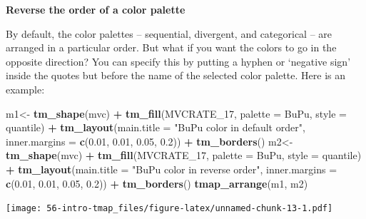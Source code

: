 \documentclass[
]{book}
\newenvironment{Shaded}{\begin{snugshade}}{\end{snugshade}}
\newcommand{\AttributeTok}[1]{\textcolor[rgb]{0.13,0.29,0.53}{#1}}
\newcommand{\FloatTok}[1]{\textcolor[rgb]{0.00,0.00,0.81}{#1}}
\newcommand{\FunctionTok}[1]{\textcolor[rgb]{0.13,0.29,0.53}{\textbf{#1}}}
\newcommand{\NormalTok}[1]{#1}
\newcommand{\OtherTok}[1]{\textcolor[rgb]{0.56,0.35,0.01}{#1}}
\newcommand{\SpecialCharTok}[1]{\textcolor[rgb]{0.81,0.36,0.00}{\textbf{#1}}}
\newcommand{\StringTok}[1]{\textcolor[rgb]{0.31,0.60,0.02}{#1}}
\newenvironment{rmdtip}[1]
  {
  \begin{itemize}
  \renewcommand{\labelitemi}{
    \raisebox{-.7\height}[0pt][0pt]{
      {\setkeys{Gin}{width=3em,keepaspectratio}\texttt{[image: images/\#1]}}
    }
  }
  \setlength{\fboxsep}{1em}
  \begin{tip}
  \item
  }
  {
  \end{tip}
  \end{itemize}
  }
\begin{document}
\begin{rmdtip}{tip}
\textbf{Reverse the order of a color palette}

By default, the color palettes -- sequential, divergent, and categorical -- are arranged in a particular order. But what if you want the colors to go in the opposite direction? You can specify this by putting a hyphen or `negative sign' inside the quotes but before the name of the selected color palette. Here is an example:

\begin{Shaded}
\begin{Highlighting}[]
\NormalTok{m1}\OtherTok{\textless{}{-}} \FunctionTok{tm\_shape}\NormalTok{(mvc) }\SpecialCharTok{+}
  \FunctionTok{tm\_fill}\NormalTok{(}\StringTok{\textquotesingle{}MVCRATE\_17\textquotesingle{}}\NormalTok{,}
          \AttributeTok{palette =} \StringTok{\textquotesingle{}BuPu\textquotesingle{}}\NormalTok{,}
          \AttributeTok{style =} \StringTok{\textquotesingle{}quantile\textquotesingle{}}\NormalTok{) }\SpecialCharTok{+}
  \FunctionTok{tm\_layout}\NormalTok{(}\AttributeTok{main.title =} \StringTok{"BuPu color in default order"}\NormalTok{,}
            \AttributeTok{inner.margins =} \FunctionTok{c}\NormalTok{(}\FloatTok{0.01}\NormalTok{, }\FloatTok{0.01}\NormalTok{, }\FloatTok{0.05}\NormalTok{, }\FloatTok{0.2}\NormalTok{)) }\SpecialCharTok{+}
  \FunctionTok{tm\_borders}\NormalTok{()}
\NormalTok{m2}\OtherTok{\textless{}{-}} \FunctionTok{tm\_shape}\NormalTok{(mvc) }\SpecialCharTok{+}
  \FunctionTok{tm\_fill}\NormalTok{(}\StringTok{\textquotesingle{}MVCRATE\_17\textquotesingle{}}\NormalTok{,}
          \AttributeTok{palette =} \StringTok{\textquotesingle{}{-}BuPu\textquotesingle{}}\NormalTok{,}
          \AttributeTok{style =} \StringTok{\textquotesingle{}quantile\textquotesingle{}}\NormalTok{) }\SpecialCharTok{+}
  \FunctionTok{tm\_layout}\NormalTok{(}\AttributeTok{main.title =} \StringTok{"BuPu color in reverse order"}\NormalTok{,}
            \AttributeTok{inner.margins =} \FunctionTok{c}\NormalTok{(}\FloatTok{0.01}\NormalTok{, }\FloatTok{0.01}\NormalTok{, }\FloatTok{0.05}\NormalTok{, }\FloatTok{0.2}\NormalTok{)) }\SpecialCharTok{+}
  \FunctionTok{tm\_borders}\NormalTok{()}
\FunctionTok{tmap\_arrange}\NormalTok{(m1, m2)}
\end{Highlighting}
\end{Shaded}

\texttt{[image: 56-intro-tmap\_files/figure-latex/unnamed-chunk-13-1.pdf]}

\end{rmdtip}
\end{document}
